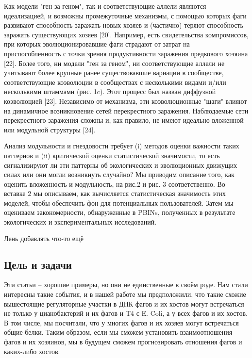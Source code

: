 \documentclass[a4paper,12pt]{article}
\begin{document}
    \par{Как модели "ген за геном", так и соответствующие аллели являются идеализацией, и возможны промежуточные 
    механизмы, с помощью которых фаги развивают способность заражать новых хозяев и (частично) теряют способность 
    заражать существующих хозяев [20]. Например, есть свидетельства компромиссов, при которых эволюционировавшие фаги 
    страдают от затрат на приспособленность с точки зрения продуктивности заражения предкового хозяина [22]. Более 
    того, ни модели "ген за геном", ни соответствующие аллели не учитывают более крупные ранее существовавшие вариации 
    в сообществе, соответствующие коэволюции в сообществах с несколькими видами и/или несколькими штаммами (рис. 1c). 
    Этот процесс был назван диффузной коэволюцией [23]. Независимо от механизма, эти коэволюционные "шаги" влияют на 
    динамичное возникновение сетей перекрестного заражения. Наблюдаемые сети перекрестного заражения сложны и, как 
    правило, не имеют идеально вложенной или модульной структуры [24].}
    
    \par{Анализ модульности и гнездовости требует (i) методов оценки важности таких паттернов и (ii) критической оценки
    статистической значимости, то есть сигнализируют ли эти паттерны об экологических и эволюционных движущих силах или
    они могли возникнуть случайно? Мы приводим описание того, как оценить вложенность и модульность, на рис.2 и рис. 3 
    соответственно. Во вставке 2 мы описываем, как вычисляется статистическая значимость этих моделей, чтобы обеспечить
    фон для потенциальных пользователей. Затем мы оцениваем закономерности, обнаруженные в PBINs, полученных в 
    результате экологических и экспериментальных исследований.}
    
    \par{{\Large Лень добавлять что-то ещё}}
    
\newpage
\begin{center}
\item \section{Цель и задачи} \label{sec:code}
\end{center}

\par{Эти статьи – хорошие примеры, но они не единственные в своём роде. Нам стали интересны такие события, и в нашей
    работе мы предположили, что такие схожие вышестоящие регуляторные участки в ДНК фагов и их хостов могут встречаться
    не только у цианобактерий и их фагов и T4 с E. Coli, а у всех фагов и их хостов. В том числе, мы посчитали, что у
    многих фагов и их хозяев могут встречаться общие белки. Таким образом, если мы сможем установить взаимоотношения
    фагов и их хозяинов, мы в будущем сможем прогнозировать отношения фагов и каких-либо хостов.}
\end{document}
